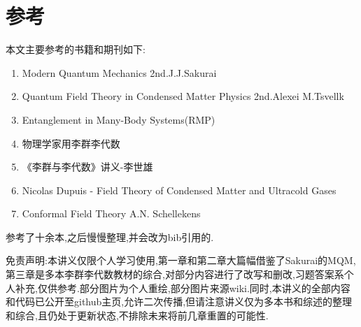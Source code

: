 \section{参考}
本文主要参考的书籍和期刊如下:
\begin{enumerate}
	\item Modern Quantum Mechanics 2nd.J.J.Sakurai
	\item Quantum Field Theory in Condensed Matter Physics 2nd.Alexei M.Tsvellk
	\item Entanglement in Many-Body Systems(RMP)
	\item 物理学家用李群李代数
	\item 《李群与李代数》讲义-李世雄
	\item Nicolas Dupuis - Field Theory of Condensed Matter and Ultracold Gases
	\item Conformal Field Theory A.N. Schellekens
\end{enumerate}
参考了十余本,之后慢慢整理,并会改为bib引用的.

免责声明:本讲义仅限个人学习使用,第一章和第二章大篇幅借鉴了Sakurai的MQM,第三章是多本李群李代数教材的综合,对部分内容进行了改写和删改,习题答案系个人补充,仅供参考.部分图片为个人重绘,部分图片来源wiki.同时,本讲义的全部内容和代码已公开至github主页,允许二次传播,但请注意讲义仅为多本书和综述的整理和综合,且仍处于更新状态,不排除未来将前几章重置的可能性.

	
	
	
	
\ifx\allfiles\undefined

	\else
	\fi
